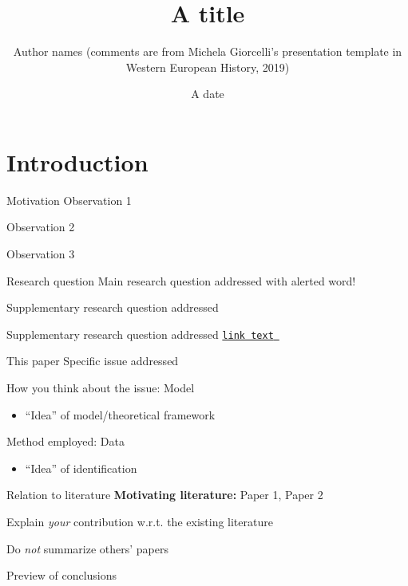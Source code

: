 \documentclass[aspectratio=169, 11pt]{beamer}
\title[Some title]{A title}
\author{Author names (comments are from Michela Giorcelli's presentation template in Western European History, 2019)}
\date{A date}
\begin{document}
\maketitle

\section{Introduction}

\begin{frame}{Motivation}
    Observation 1
    
    Observation 2
    
    Observation 3
\end{frame}

\begin{frame}{Research question}
    Main research question addressed with \alert{alerted} word!\pause
    
    Supplementary research question addressed\pause
    
    Supplementary research question addressed \hyperlink{app_example}{\texttt{link text}~ }
\end{frame}

\begin{frame}{This paper}
    Specific issue addressed
    
    How you think about the issue: Model
    \begin{itemize}
        \item ``Idea'' of model/theoretical framework
    \end{itemize}
    
    Method employed: Data
    \begin{itemize}
        \item ``Idea'' of identification
    \end{itemize}
\end{frame}

\begin{frame}{Relation to literature}
    \textbf{Motivating literature:} Paper 1, Paper 2
    
    Explain \emph{your} contribution w.r.t. the existing literature
    
    Do \emph{not} summarize others' papers
\end{frame}

\begin{frame}{Preview of conclusions}
    
\end{frame}
\end{document}
